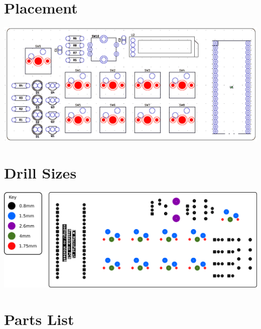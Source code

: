\section{Placement}
\label{sec:placement}
\includegraphics[width=\textwidth]{img/component-layout.png}


\section{Drill Sizes}
\label{sec:drillsizes}
\includegraphics[width=\textheight,angle=90]{img/hole-colours.png}


\section{Parts List}
\label{sec:partslist}

